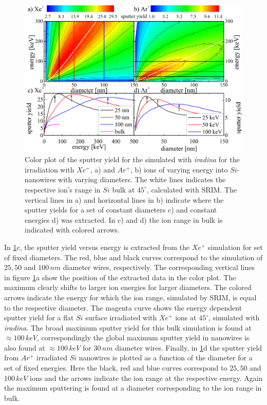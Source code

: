 \begin{figure}[th]
	\centering
		\includegraphics[width=.9\textwidth]{images/sputtering_diameter_energy.png}
	\caption{Color plot of the sputter yield for the simulated with \emph{iradina} for the irradiation with $Xe^+$, a) and $Ar^+$, b) ions of varying energy into $Si$-nanowires with varying diameters. The white lines indicates the respective ion's range in $Si$ bulk at $45^\circ$, calculated with SRIM. The vertical lines in a) and horizontal lines in b) indicate where the sputter yields for a set of constant diameters c) and constant energies d) was extracted. In c) and d) the ion range in bulk is indicated with colored arrows.} 
	\label{sputtering_de}
\end{figure} 

In \ref{sputtering_de}c, the sputter yield versus energy is extracted from the $Xe^+$ simulation for set of fixed diameters. The red, blue and black curves correspond to the simulation of $25, 50$ and $100\,nm$ diameter wires, respectively. The corresponding vertical lines in figure \ref{sputtering_de}a show the position of the extracted data in the color plot. The maximum clearly shifts to larger ion energies for larger diameters. The colored arrows indicate the energy for which the ion range, simulated by SRIM, is equal to the respective diameter. The magenta curve shows the energy dependent sputter yield for a flat $Si$ surface irradiated with $Xe^+$ ions at $45^\circ$, simulated with \emph{iradina}. The broad maximum sputter yield for this bulk simulation is found at $\approx 100 \,keV$, correspondingly the global maximum sputter yield in nanowires is also found at $\approx 100 \,keV$ for $30\,nm$ diameter wires. Finally, in \ref{sputtering_de}d the sputter yield from $Ar^+$ irradiated $Si$ nanowires is plotted as a function of the diameter for a set of fixed energies. Here the black, red and blue curves correspond to $25, 50$ and $100\,keV$ ions and the arrows indicate the ion range at the respective energy. Again the maximum sputtering is found at a diameter corresponding to the ion range in bulk.

